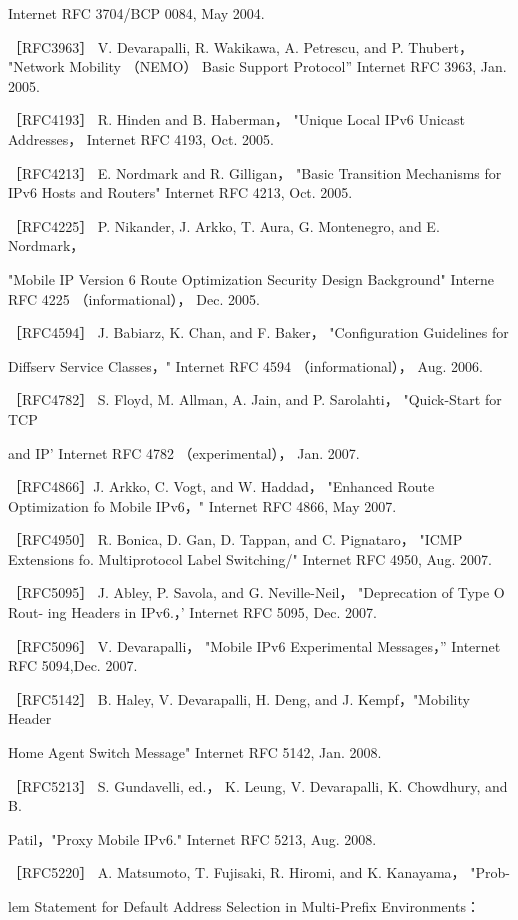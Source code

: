 Internet RFC 3704/BCP 0084, May 2004.

［RFC3963］ V. Devarapalli, R. Wakikawa, A. Petrescu, and P. Thubert， "Network
Mobility （NEMO） Basic Support Protocol” Internet RFC 3963, Jan. 2005.

［RFC4193］ R. Hinden and B. Haberman， "Unique Local IPv6 Unicast Addresses，
Internet RFC 4193, Oct. 2005.

［RFC4213］ E. Nordmark and R. Gilligan， "Basic Transition Mechanisms for IPv6
Hosts and Routers" Internet RFC 4213, Oct. 2005.

［RFC4225］ P. Nikander, J. Arkko, T. Aura, G. Montenegro, and E. Nordmark，

"Mobile IP Version 6 Route Optimization Security Design Background" Interne
RFC 4225 （informational）， Dec. 2005.

［RFC4594］ J. Babiarz, K. Chan, and F. Baker， "Configuration Guidelines for

Diffserv Service Classes，" Internet RFC 4594 （informational）， Aug. 2006.

［RFC4782］ S. Floyd, M. Allman, A. Jain, and P. Sarolahti， "Quick-Start for TCP

and IP' Internet RFC 4782 （experimental）， Jan. 2007.

［RFC4866］J. Arkko, C. Vogt, and W. Haddad， "Enhanced Route Optimization fo
Mobile IPv6，" Internet RFC 4866, May 2007.

［RFC4950］ R. Bonica, D. Gan, D. Tappan, and C. Pignataro， "ICMP Extensions fo.
Multiprotocol Label Switching/" Internet RFC 4950, Aug. 2007.

［RFC5095］ J. Abley, P. Savola, and G. Neville-Neil， "Deprecation of Type O Rout-
ing Headers in IPv6.，' Internet RFC 5095, Dec. 2007.

［RFC5096］ V. Devarapalli， "Mobile IPv6 Experimental Messages，” Internet RFC
5094,Dec. 2007.

［RFC5142］ B. Haley, V. Devarapalli, H. Deng, and J. Kempf，"Mobility Header

Home Agent Switch Message" Internet RFC 5142, Jan. 2008.

［RFC5213］ S. Gundavelli, ed.， K. Leung, V. Devarapalli, K. Chowdhury, and B.

Patil，"Proxy Mobile IPv6." Internet RFC 5213, Aug. 2008.

［RFC5220］ A. Matsumoto, T. Fujisaki, R. Hiromi, and K. Kanayama， "Prob-

lem Statement for Default Address Selection in Multi-Prefix Environments：

